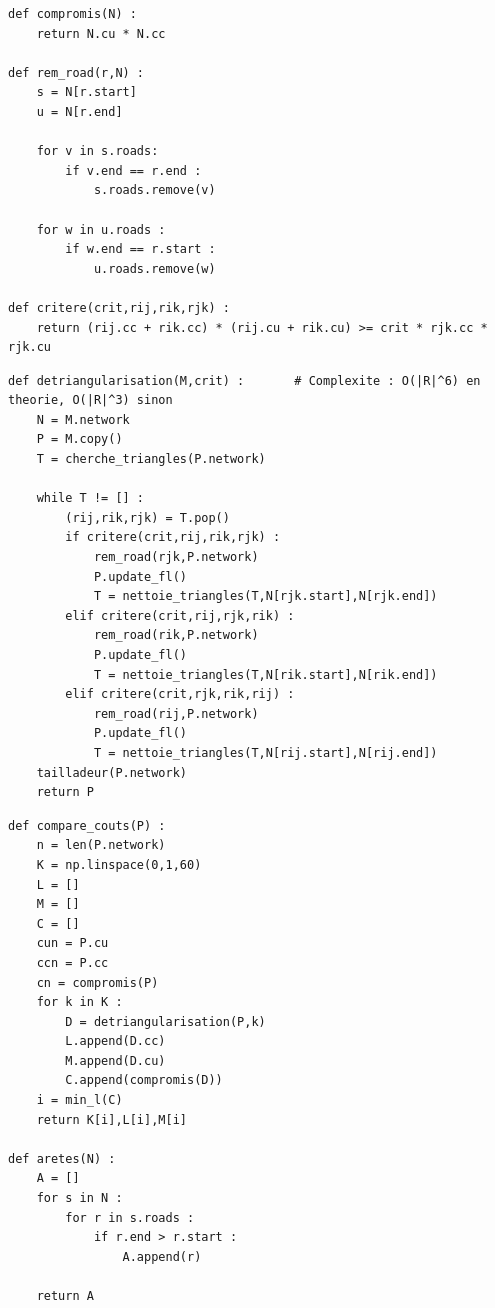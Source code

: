 \documentclass{beamer}[11pt]
\begin{document}
		\begin{frame}[containsverbatim]
\begin{lstlisting}
def compromis(N) :
    return N.cu * N.cc

def rem_road(r,N) :
    s = N[r.start]
    u = N[r.end]

    for v in s.roads:
        if v.end == r.end :
            s.roads.remove(v)

    for w in u.roads :
        if w.end == r.start :
            u.roads.remove(w)

def critere(crit,rij,rik,rjk) :
    return (rij.cc + rik.cc) * (rij.cu + rik.cu) >= crit * rjk.cc * rjk.cu
\end{lstlisting}
		\end{frame}

		\begin{frame}[containsverbatim]
\begin{lstlisting}
def detriangularisation(M,crit) :		# Complexite : O(|R|^6) en theorie, O(|R|^3) sinon
    N = M.network
    P = M.copy()
    T = cherche_triangles(P.network)

    while T != [] :
        (rij,rik,rjk) = T.pop()
        if critere(crit,rij,rik,rjk) :
            rem_road(rjk,P.network)
            P.update_fl()
            T = nettoie_triangles(T,N[rjk.start],N[rjk.end])
        elif critere(crit,rij,rjk,rik) :
            rem_road(rik,P.network)
            P.update_fl()
            T = nettoie_triangles(T,N[rik.start],N[rik.end])
        elif critere(crit,rjk,rik,rij) :
            rem_road(rij,P.network)
            P.update_fl()
            T = nettoie_triangles(T,N[rij.start],N[rij.end])
    tailladeur(P.network)
    return P
\end{lstlisting}
		\end{frame}

		\begin{frame}[containsverbatim]
\begin{lstlisting}
def compare_couts(P) :
    n = len(P.network)
    K = np.linspace(0,1,60)
    L = []
    M = []
    C = []
    cun = P.cu
    ccn = P.cc
    cn = compromis(P)
    for k in K :
        D = detriangularisation(P,k)
        L.append(D.cc)
        M.append(D.cu)
        C.append(compromis(D))
    i = min_l(C)
    return K[i],L[i],M[i]

def aretes(N) :
    A = []
    for s in N :
        for r in s.roads :
            if r.end > r.start :
                A.append(r)

    return A
\end{lstlisting}
		\end{frame}
\end{document}
